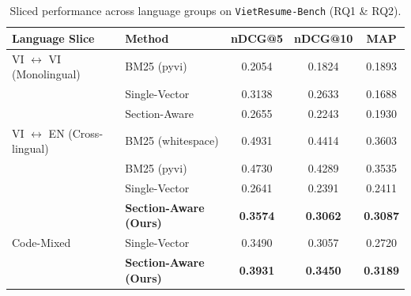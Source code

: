 \begin{table}[t]
\centering\small
\caption{Sliced performance across language groups on \texttt{VietResume-Bench} (RQ1 \& RQ2).}
\label{tab:vietresume_bilingual}
\begin{tabular}{@{}llccc@{}}
\hline
\textbf{Language Slice} & \textbf{Method} & \textbf{nDCG@5} & \textbf{nDCG@10} & \textbf{MAP} \\
\hline
VI $\leftrightarrow$ VI (Monolingual) & BM25 (pyvi) & 0.2054 & 0.1824 & 0.1893 \\
 & Single-Vector & 0.3138 & 0.2633 & 0.1688 \\
 & Section-Aware & 0.2655 & 0.2243 & 0.1930 \\
\hline
VI $\leftrightarrow$ EN (Cross-lingual) & BM25 (whitespace) & 0.4931 & 0.4414 & 0.3603 \\
 & BM25 (pyvi) & 0.4730 & 0.4289 & 0.3535 \\
 & Single-Vector & 0.2641 & 0.2391 & 0.2411 \\
 & \textbf{Section-Aware (Ours)} & \textbf{0.3574} & \textbf{0.3062} & \textbf{0.3087} \\
\hline
Code-Mixed & Single-Vector & 0.3490 & 0.3057 & 0.2720 \\
 & \textbf{Section-Aware (Ours)} & \textbf{0.3931} & \textbf{0.3450} & \textbf{0.3189} \\
\hline
\end{tabular}
\end{table}

